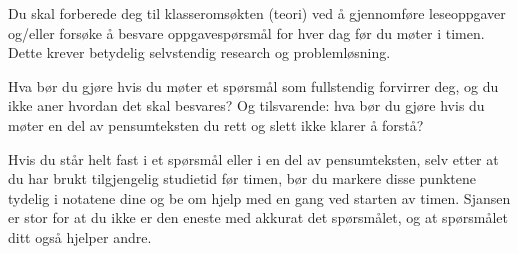 
Du skal forberede deg til klasseromsøkten (teori) ved å gjennomføre leseoppgaver og/eller forsøke å besvare oppgavespørsmål for hver dag før du møter i timen. Dette krever betydelig selvstendig research og problemløsning.

Hva bør du gjøre hvis du møter et spørsmål som fullstendig forvirrer deg, og du ikke aner hvordan det skal besvares? Og tilsvarende: hva bør du gjøre hvis du møter en del av pensumteksten du rett og slett ikke klarer å forstå?







Hvis du står helt fast i et spørsmål eller i en del av pensumteksten, selv etter at du har brukt tilgjengelig studietid før timen, bør du markere disse punktene tydelig i notatene dine og be om hjelp med en gang ved starten av timen. Sjansen er stor for at du ikke er den eneste med akkurat det spørsmålet, og at spørsmålet ditt også hjelper andre.









